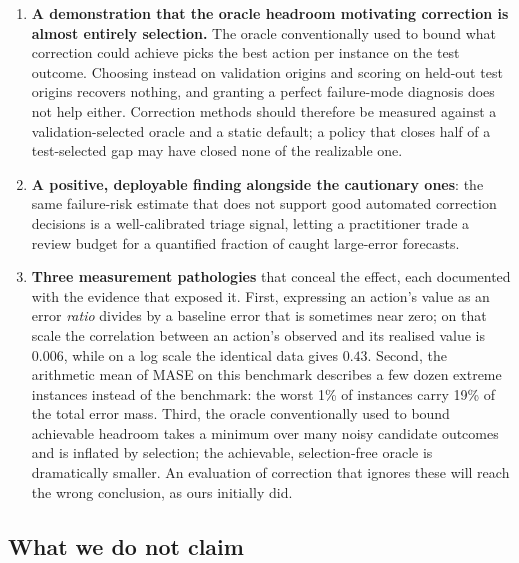 \begin{enumerate}
  \item \textbf{A demonstration that the oracle headroom motivating correction is
  almost entirely selection.} The oracle conventionally used to bound what correction
  could achieve picks the best action per instance on the test outcome. Choosing instead
  on validation origins and scoring on held-out test origins recovers nothing, and
  granting a perfect failure-mode diagnosis does not help either. Correction methods
  should therefore be measured against a validation-selected oracle and a static
  default; a policy that closes half of a test-selected gap may have closed none of the
  realizable one.

  \item \textbf{A positive, deployable finding alongside the cautionary ones}: the same
  failure-risk estimate that does not support good automated correction decisions is a
  well-calibrated triage signal, letting a practitioner trade a review budget for a
  quantified fraction of caught large-error forecasts.

  \item \textbf{Three measurement pathologies} that conceal the effect, each documented
  with the evidence that exposed it. First, expressing an action's value as an error
  \emph{ratio} divides by a baseline error that is sometimes near zero; on that scale the
  correlation between an action's observed and its realised value is $0.006$, while on a
  log scale the identical data gives $0.43$. Second, the arithmetic mean of MASE on this
  benchmark describes a few dozen extreme instances instead of the benchmark: the worst
  1\% of instances carry 19\% of the total error mass. Third, the oracle conventionally
  used to bound achievable headroom takes a minimum over many noisy candidate outcomes
  and is inflated by selection; the achievable, selection-free oracle is dramatically
  smaller. An evaluation of correction that ignores these will reach the wrong
  conclusion, as ours initially did.
\end{enumerate}

\subsection{What we do not claim}

